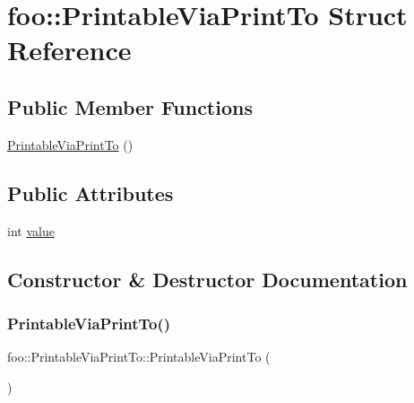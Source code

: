 \hypertarget{structfoo_1_1_printable_via_print_to}{}\section{foo\+:\+:Printable\+Via\+Print\+To Struct Reference}
\label{structfoo_1_1_printable_via_print_to}
\subsection*{Public Member Functions}
\begin{DoxyCompactItemize}
\item 
\hyperlink{structfoo_1_1_printable_via_print_to_aa0b30386f09ac39f88e3b54a9397ea01}{Printable\+Via\+Print\+To} ()
\end{DoxyCompactItemize}
\subsection*{Public Attributes}
\begin{DoxyCompactItemize}
\item 
int \hyperlink{structfoo_1_1_printable_via_print_to_a16f8c6420275d86f0d0112ca5a41bca2}{value}
\end{DoxyCompactItemize}


\subsection{Constructor \& Destructor Documentation}
\mbox{\label{structfoo_1_1_printable_via_print_to_aa0b30386f09ac39f88e3b54a9397ea01}} 
\subsubsection{\texorpdfstring{Printable\+Via\+Print\+To()}{PrintableViaPrintTo()}}
{\footnotesize\ttfamily foo\+::\+Printable\+Via\+Print\+To\+::\+Printable\+Via\+Print\+To (\begin{DoxyParamCaption}{ }\end{DoxyParamCaption})\hspace{0.3cm}{\ttfamily [inline]}}



